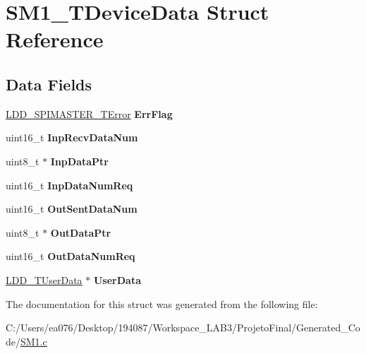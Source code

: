 \hypertarget{struct_s_m1___t_device_data}{\section{S\-M1\-\_\-\-T\-Device\-Data Struct Reference}
\label{struct_s_m1___t_device_data}
}
\subsection*{Data Fields}
\begin{DoxyCompactItemize}
\item 
\hypertarget{struct_s_m1___t_device_data_a33ce437f983e92204d0f15ef53f5835d}{\hyperlink{group___p_e___types__module_ga2ea1cac60780052d8927996feafc3c87}{L\-D\-D\-\_\-\-S\-P\-I\-M\-A\-S\-T\-E\-R\-\_\-\-T\-Error} {\bfseries Err\-Flag}}\label{struct_s_m1___t_device_data_a33ce437f983e92204d0f15ef53f5835d}

\item 
\hypertarget{struct_s_m1___t_device_data_a868095dc7e97443307738d21d14ad71f}{uint16\-\_\-t {\bfseries Inp\-Recv\-Data\-Num}}\label{struct_s_m1___t_device_data_a868095dc7e97443307738d21d14ad71f}

\item 
\hypertarget{struct_s_m1___t_device_data_a26344a9a2a5fe9276976666848e92cfe}{uint8\-\_\-t $\ast$ {\bfseries Inp\-Data\-Ptr}}\label{struct_s_m1___t_device_data_a26344a9a2a5fe9276976666848e92cfe}

\item 
\hypertarget{struct_s_m1___t_device_data_a86f6cccdee42665e5b5c7d6a3997d998}{uint16\-\_\-t {\bfseries Inp\-Data\-Num\-Req}}\label{struct_s_m1___t_device_data_a86f6cccdee42665e5b5c7d6a3997d998}

\item 
\hypertarget{struct_s_m1___t_device_data_ad88b59f561d24031a6b44990bd4303f9}{uint16\-\_\-t {\bfseries Out\-Sent\-Data\-Num}}\label{struct_s_m1___t_device_data_ad88b59f561d24031a6b44990bd4303f9}

\item 
\hypertarget{struct_s_m1___t_device_data_a2b3e1b2c86b7955437357ca62c7a49d5}{uint8\-\_\-t $\ast$ {\bfseries Out\-Data\-Ptr}}\label{struct_s_m1___t_device_data_a2b3e1b2c86b7955437357ca62c7a49d5}

\item 
\hypertarget{struct_s_m1___t_device_data_a49902d0d50a146993f414ef368b9665e}{uint16\-\_\-t {\bfseries Out\-Data\-Num\-Req}}\label{struct_s_m1___t_device_data_a49902d0d50a146993f414ef368b9665e}

\item 
\hypertarget{struct_s_m1___t_device_data_a14e5ec0be903e8bbef9cab6f0255d293}{\hyperlink{group___p_e___types__module_ga0b66a73f87238a782318aa0be7578e35}{L\-D\-D\-\_\-\-T\-User\-Data} $\ast$ {\bfseries User\-Data}}\label{struct_s_m1___t_device_data_a14e5ec0be903e8bbef9cab6f0255d293}

\end{DoxyCompactItemize}


The documentation for this struct was generated from the following file\-:\begin{DoxyCompactItemize}
\item 
C\-:/\-Users/ea076/\-Desktop/194087/\-Workspace\-\_\-\-L\-A\-B3/\-Projeto\-Final/\-Generated\-\_\-\-Code/\hyperlink{_s_m1_8c}{S\-M1.\-c}\end{DoxyCompactItemize}
